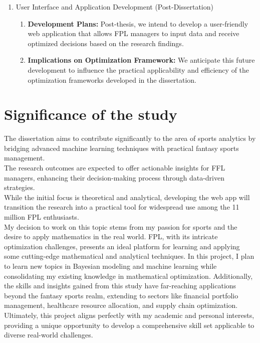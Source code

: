 \begin{enumerate}
				\item[(v)] User Interface and Application Development (Post-Dissertation)
				\begin{enumerate}
					\item \textbf{Development Plans:} Post-thesis, we intend to develop a user-friendly web application that allows FPL managers to input data and receive optimized decisions based on the research findings.

					\item \textbf{Implications on Optimization Framework:} We anticipate this future development to influence the practical applicability and efficiency of the optimization frameworks developed in the dissertation.
				\end{enumerate}
			\end{enumerate}


		\section{Significance of the study}
			The dissertation aims to contribute significantly to the area of sports analytics by bridging advanced machine learning techniques with practical fantasy sports management.\\
			The research outcomes are expected to offer actionable insights for FFL managers, enhancing their decision-making process through data-driven strategies.\\
			While the initial focus is theoretical and analytical, developing the web app will transition the research into a practical tool for widespread use among the 11 million FPL enthusiasts. \\

			My decision to work on this topic stems from my passion for sports and the desire to apply mathematics in the real world. FPL, with its intricate optimization challenges, presents an ideal platform for learning and applying some cutting-edge mathematical and analytical techniques. In this project, I plan to learn new topics in Bayesian modeling and machine learning while consolidating my existing knowledge in mathematical optimization. Additionally, the skills and insights gained from this study have far-reaching applications beyond the fantasy sports realm, extending to sectors like financial portfolio management, healthcare resource allocation, and supply chain optimization. Ultimately, this project aligns perfectly with my academic and personal interests, providing a unique opportunity to develop a comprehensive skill set applicable to diverse real-world challenges.

